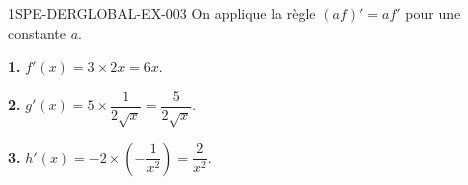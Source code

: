 \begin{corrige}{1SPE-DERGLOBAL-EX-003}
On applique la règle $(af)' = af'$ pour une constante $a$.

\textbf{1.} $f'(x) = 3 \times 2x = 6x$.

\textbf{2.} $g'(x) = 5 \times \dfrac{1}{2\sqrt{x}} = \dfrac{5}{2\sqrt{x}}$.

\textbf{3.} $h'(x) = -2 \times \left(-\dfrac{1}{x^2}\right) = \dfrac{2}{x^2}$.
\end{corrige}

